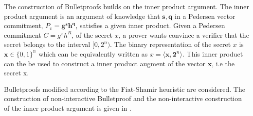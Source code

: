 The construction of Bulletproofs builds on the inner product argument. The inner product argument is an argument of knowledge that $\textbf{s},\mathbf{q}$ in a Pedersen vector commitment, $P_v=\mathbf{g}^\mathbf{s}\mathbf{h}^\mathbf{q}$, satisfies a given inner product. Given a Pedersen commitment $C=g^x h^R$, of the secret $x$, a prover wants  convince a verifier that the secret belongs to the interval $[0,2^n)$.  The binary representation of the secret $x$ is $\bm{x}\in\{0,1\}^n$ which can be  equivalently written as $x= \langle \bm{x},\mathbf{2}^n\rangle $. This inner product can the be used to construct a inner product augment of the vector  $\mathbf{x}$, i.e the secret x.

Bulletproofs modified according to the Fiat-Shamir heuristic are considered.  The construction of  non-interactive Bulletproof and the non-interactive construction of the inner product argument is given in \cite{ZKRP_Morais}.






